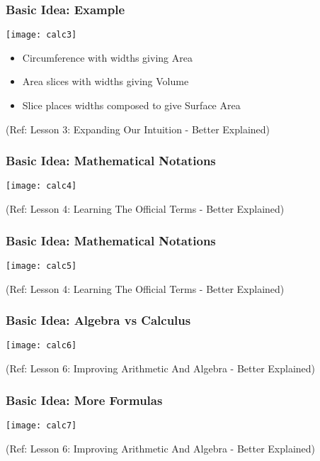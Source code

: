  \begin{frame}[fragile]\frametitle{Basic Idea: Example}
 
\begin{center}
\texttt{[image: calc3]}
\end{center}


\begin{itemize}
\item Circumference with widths giving Area
\item Area slices with widths giving Volume
\item Slice places widths composed to give Surface Area
\end{itemize}

\tiny{(Ref: Lesson 3: Expanding Our Intuition - Better Explained)}
\end{frame}

 \begin{frame}[fragile]\frametitle{Basic Idea: Mathematical Notations}
 
\begin{center}
\texttt{[image: calc4]}
\end{center}

\tiny{(Ref: Lesson 4: Learning The Official Terms - Better Explained)}
\end{frame}

 \begin{frame}[fragile]\frametitle{Basic Idea: Mathematical Notations}
 
\begin{center}
\texttt{[image: calc5]}
\end{center}

\tiny{(Ref: Lesson 4: Learning The Official Terms - Better Explained)}
\end{frame}

 \begin{frame}[fragile]\frametitle{Basic Idea: Algebra vs Calculus}
 
\begin{center}
\texttt{[image: calc6]}
\end{center}

\tiny{(Ref: Lesson 6: Improving Arithmetic And Algebra - Better Explained)}
\end{frame}

 \begin{frame}[fragile]\frametitle{Basic Idea: More Formulas}
 
\begin{center}
\texttt{[image: calc7]}
\end{center}

\tiny{(Ref: Lesson 6: Improving Arithmetic And Algebra - Better Explained)}
\end{frame}